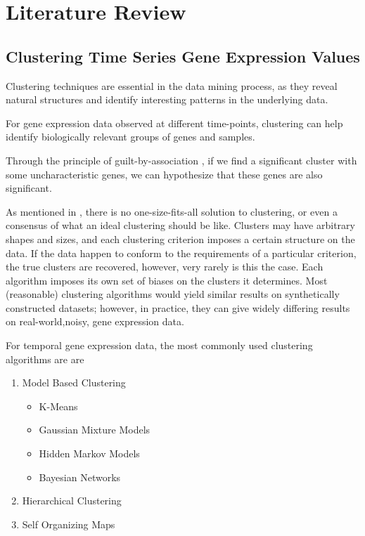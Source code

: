 \clearpage
\section{Literature Review}
\label{sec:LitReview}

\subsection{Clustering Time Series Gene Expression Values}

Clustering techniques are essential in the data mining process, as they reveal natural structures and identify interesting patterns in the underlying data.

For gene expression data observed at different time-points, clustering can help identify biologically relevant groups of genes and samples.

Through the principle of guilt-by-association \cite{quackenbush2003microarrays}, if we find a significant cluster with some uncharacteristic genes, we can hypothesize that these genes are also significant.

As mentioned in \cite{d2005does}, there is no one-size-fits-all solution to clustering, or even a consensus of what an ideal clustering should be like. Clusters may have arbitrary shapes and sizes, and each clustering criterion imposes a certain structure on the data. If the data happen to conform to the requirements of a particular criterion, the true clusters are recovered, however, very rarely is this the case. Each algorithm imposes its own set of biases on the clusters it determines. Most (reasonable) clustering algorithms would yield similar results on synthetically constructed datasets; however, in practice, they can give widely differing results on real-world,noisy, gene expression data.

For temporal gene expression data, the most commonly used clustering algorithms are \cite{friedman2000using,jiang2004cluster,schliep2003using} are
\begin{enumerate}
    \item Model Based Clustering
    \begin{itemize} 
        \item K-Means 
        \item Gaussian Mixture Models
        \item Hidden Markov Models
        \item Bayesian Networks
    \end{itemize}
    \item Hierarchical Clustering
    \item Self Organizing Maps
\end{enumerate}

